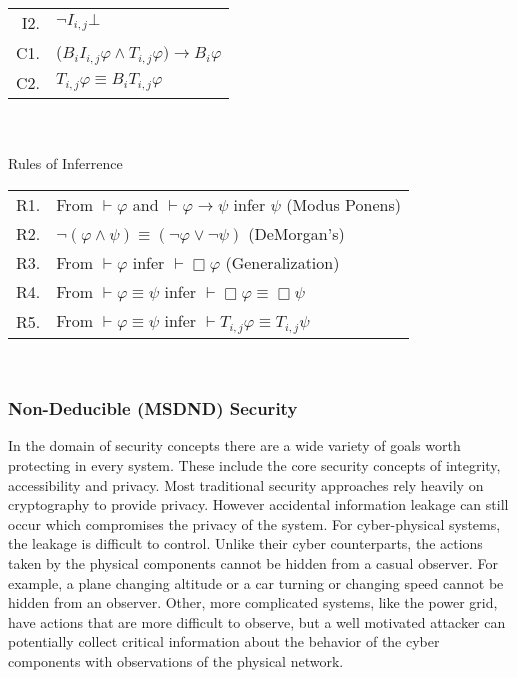\documentclass[12pt,oneside]{article}
\begin{document}
\begin{table*}[!t]
\begin{tabular}{r l}
I2. & $\neg I_{i,j} \bot$ \\
C1. & ($B_i I_{i,j} \varphi \wedge T_{i,j} \varphi) \rightarrow B_i \varphi$ \\
C2. & $T_{i,j} \varphi \equiv B_i T_{i,j} \varphi$ \\
\end{tabular} \\~\\
Rules of Inferrence \\
\begin{tabular}{r l}
R1. & From $\vdash \varphi$ and $\vdash \varphi \rightarrow \psi$ infer $\psi$ (Modus Ponens) \\
R2. & $\neg (\varphi \wedge \psi) \equiv (\neg \varphi \vee \neg \psi)$ (DeMorgan's)\\
R3. & From $\vdash \varphi$ infer $\vdash \Box \varphi$ (Generalization)\\
R4. & From $\vdash \varphi \equiv \psi$ infer $\vdash \Box \varphi \equiv \Box \psi$\\
R5. & From $\vdash \varphi \equiv \psi$ infer $\vdash T_{i,j} \varphi \equiv T_{i,j} \psi$\\
\end{tabular} \\
\caption{The Axiomatic System}
\label{tab:axiomaticsys}
\end{table*}

\subsubsection{Non-Deducible (MSDND) Security}

In the domain of security concepts there are a wide variety of goals worth protecting in every system. These include the core security concepts of integrity, accessibility and privacy. Most traditional security approaches rely heavily on cryptography to provide privacy. However accidental information leakage can still occur which compromises the privacy of the system. For cyber-physical systems, the leakage is difficult to control. Unlike their cyber counterparts, the actions taken by the physical components cannot be hidden from a casual observer. For example, a plane changing altitude or a car turning or changing speed cannot be hidden from an observer. Other, more complicated systems, like the power grid, have actions that are more difficult to observe, but a well motivated attacker can potentially collect critical information about the behavior of the cyber components with observations of the physical network.
\end{document}
